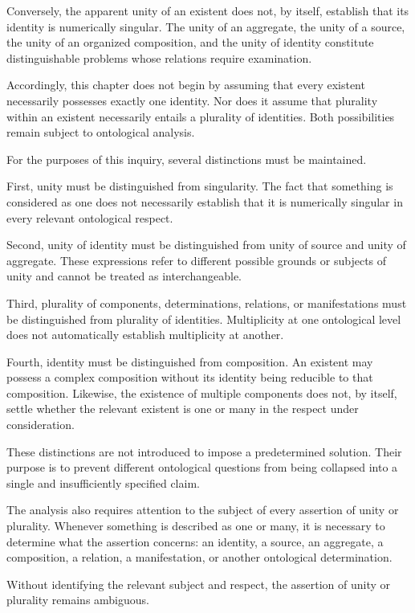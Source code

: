 Conversely, the apparent unity of an existent does not,
by itself, establish that its identity is numerically
singular. The unity of an aggregate, the unity of a source,
the unity of an organized composition, and the unity
of identity constitute distinguishable problems whose
relations require examination.

Accordingly, this chapter does not begin by assuming
that every existent necessarily possesses exactly one
identity. Nor does it assume that plurality within an
existent necessarily entails a plurality of identities.
Both possibilities remain subject to ontological analysis.

For the purposes of this inquiry, several distinctions
must be maintained.

First, unity must be distinguished from singularity.
The fact that something is considered as one does not
necessarily establish that it is numerically singular
in every relevant ontological respect.

Second, unity of identity must be distinguished from
unity of source and unity of aggregate. These expressions
refer to different possible grounds or subjects of unity
and cannot be treated as interchangeable.

Third, plurality of components, determinations, relations,
or manifestations must be distinguished from plurality
of identities. Multiplicity at one ontological level
does not automatically establish multiplicity at another.

Fourth, identity must be distinguished from composition.
An existent may possess a complex composition without
its identity being reducible to that composition. Likewise,
the existence of multiple components does not, by itself,
settle whether the relevant existent is one or many in
the respect under consideration.

These distinctions are not introduced to impose a
predetermined solution. Their purpose is to prevent
different ontological questions from being collapsed
into a single and insufficiently specified claim.

The analysis also requires attention to the subject
of every assertion of unity or plurality. Whenever
something is described as one or many, it is necessary
to determine what the assertion concerns: an identity,
a source, an aggregate, a composition, a relation,
a manifestation, or another ontological determination.

Without identifying the relevant subject and respect,
the assertion of unity or plurality remains ambiguous.

